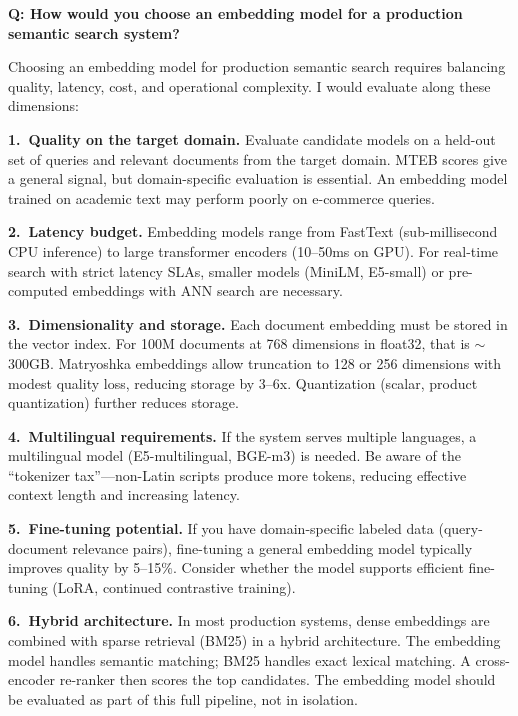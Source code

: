 \begin{interviewq}
\textbf{Q: How would you choose an embedding model for a production semantic
search system?}

 \quad {} \quad \badgefreq{\freqmed}

\stronganswer
Choosing an embedding model for production semantic search requires balancing
quality, latency, cost, and operational complexity.  I would evaluate along
these dimensions:

\textbf{1.\ Quality on the target domain.}  Evaluate candidate models on
a held-out set of queries and relevant documents from the target domain.
MTEB scores give a general signal, but domain-specific evaluation is
essential.  An embedding model trained on academic text may perform poorly
on e-commerce queries.

\textbf{2.\ Latency budget.}  Embedding models range from FastText
(sub-millisecond CPU inference) to large transformer encoders (10--50ms
on GPU).  For real-time search with strict latency SLAs, smaller models
(MiniLM, E5-small) or pre-computed embeddings with ANN search are necessary.

\textbf{3.\ Dimensionality and storage.}  Each document embedding must be
stored in the vector index.  For 100M documents at 768 dimensions in
float32, that is $\sim$300GB.  Matryoshka embeddings allow truncation to
128 or 256 dimensions with modest quality loss, reducing storage by 3--6x.
Quantization (scalar, product quantization) further reduces storage.

\textbf{4.\ Multilingual requirements.}  If the system serves multiple
languages, a multilingual model (E5-multilingual, BGE-m3) is needed.  Be
aware of the ``tokenizer tax''---non-Latin scripts produce more tokens,
reducing effective context length and increasing latency.

\textbf{5.\ Fine-tuning potential.}  If you have domain-specific labeled
data (query-document relevance pairs), fine-tuning a general embedding model
typically improves quality by 5--15\%.  Consider whether the model supports
efficient fine-tuning (LoRA, continued contrastive training).

\textbf{6.\ Hybrid architecture.}  In most production systems, dense
embeddings are combined with sparse retrieval (BM25) in a hybrid
architecture.  The embedding model handles semantic matching; BM25 handles
exact lexical matching.  A cross-encoder re-ranker then scores the top
candidates.  The embedding model should be evaluated as part of this full
pipeline, not in isolation.


\end{interviewq}
